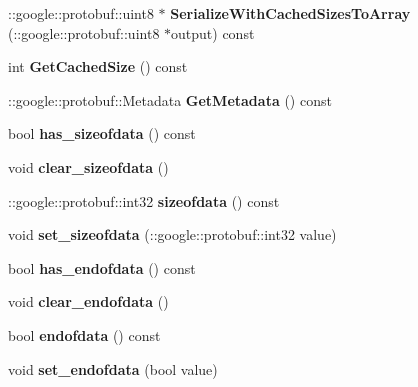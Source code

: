 \begin{DoxyCompactItemize}
\item 
\hypertarget{classstruct_definitions_1_1_header_ad1d40bc4d3056919e7bc40f0434590f2}{}\label{classstruct_definitions_1_1_header_ad1d40bc4d3056919e7bc40f0434590f2} 
\+::google\+::protobuf\+::uint8 $\ast$ {\bfseries Serialize\+With\+Cached\+Sizes\+To\+Array} (\+::google\+::protobuf\+::uint8 $\ast$output) const
\item 
\hypertarget{classstruct_definitions_1_1_header_aae6db11e09121a9b45c041aa7c099385}{}\label{classstruct_definitions_1_1_header_aae6db11e09121a9b45c041aa7c099385} 
int {\bfseries Get\+Cached\+Size} () const
\item 
\hypertarget{classstruct_definitions_1_1_header_a4fa5faf219bb07996778b8a727ee2b2c}{}\label{classstruct_definitions_1_1_header_a4fa5faf219bb07996778b8a727ee2b2c} 
\+::google\+::protobuf\+::\+Metadata {\bfseries Get\+Metadata} () const
\item 
\hypertarget{classstruct_definitions_1_1_header_a51d22b48ed82b566d1b0c031998f9000}{}\label{classstruct_definitions_1_1_header_a51d22b48ed82b566d1b0c031998f9000} 
bool {\bfseries has\+\_\+sizeofdata} () const
\item 
\hypertarget{classstruct_definitions_1_1_header_ac0b42bdef233d051a4a8b2e5e1e9b4d2}{}\label{classstruct_definitions_1_1_header_ac0b42bdef233d051a4a8b2e5e1e9b4d2} 
void {\bfseries clear\+\_\+sizeofdata} ()
\item 
\hypertarget{classstruct_definitions_1_1_header_ad23cb26cd20fdb126d785321d26545aa}{}\label{classstruct_definitions_1_1_header_ad23cb26cd20fdb126d785321d26545aa} 
\+::google\+::protobuf\+::int32 {\bfseries sizeofdata} () const
\item 
\hypertarget{classstruct_definitions_1_1_header_ab5a09325549068d59e15d45aaeabb9f7}{}\label{classstruct_definitions_1_1_header_ab5a09325549068d59e15d45aaeabb9f7} 
void {\bfseries set\+\_\+sizeofdata} (\+::google\+::protobuf\+::int32 value)
\item 
\hypertarget{classstruct_definitions_1_1_header_a429652a532d45e30f672cab54f990090}{}\label{classstruct_definitions_1_1_header_a429652a532d45e30f672cab54f990090} 
bool {\bfseries has\+\_\+endofdata} () const
\item 
\hypertarget{classstruct_definitions_1_1_header_a90735e9bc334cf76a4e88feac2b5c960}{}\label{classstruct_definitions_1_1_header_a90735e9bc334cf76a4e88feac2b5c960} 
void {\bfseries clear\+\_\+endofdata} ()
\item 
\hypertarget{classstruct_definitions_1_1_header_ae38a4f46e685a388cff07eb15c9f8102}{}\label{classstruct_definitions_1_1_header_ae38a4f46e685a388cff07eb15c9f8102} 
bool {\bfseries endofdata} () const
\item 
\hypertarget{classstruct_definitions_1_1_header_a30371ac402833eb3b8bf0e201be0e286}{}\label{classstruct_definitions_1_1_header_a30371ac402833eb3b8bf0e201be0e286} 
void {\bfseries set\+\_\+endofdata} (bool value)
\end{DoxyCompactItemize}
